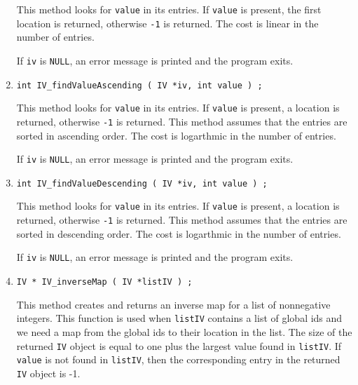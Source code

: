 \begin{enumerate}
This method looks for {\tt value} in its entries.
If {\tt value} is present, the first location is returned,
otherwise {\tt -1} is returned.
The cost is linear in the number of entries.
\par {}
If {\tt iv} is {\tt NULL},
an error message is printed and the program exits.
\item
\begin{verbatim}
int IV_findValueAscending ( IV *iv, int value ) ;
\end{verbatim}
This method looks for {\tt value} in its entries.
If {\tt value} is present, a location is returned,
otherwise {\tt -1} is returned.
This method assumes that the entries are sorted in ascending order.
The cost is logarthmic in the number of entries.
\par {}
If {\tt iv} is {\tt NULL},
an error message is printed and the program exits.
\item
\begin{verbatim}
int IV_findValueDescending ( IV *iv, int value ) ;
\end{verbatim}
This method looks for {\tt value} in its entries.
If {\tt value} is present, a location is returned,
otherwise {\tt -1} is returned.
This method assumes that the entries are sorted in descending order.
The cost is logarthmic in the number of entries.
\par {}
If {\tt iv} is {\tt NULL},
an error message is printed and the program exits.
\item
\begin{verbatim}
IV * IV_inverseMap ( IV *listIV ) ;
\end{verbatim}
This method creates and returns an inverse map for a list of 
nonnegative integers.
This function is used when {\tt listIV} contains a list of global
ids and we need a map from the global ids to their location in the list.
The size of the returned {\tt IV} object is equal to one plus the
largest value found in {\tt listIV}.
If {\tt value} is not found in {\tt listIV}, then the corresponding
entry in the returned {\tt IV} object is -1.

\end{enumerate}

